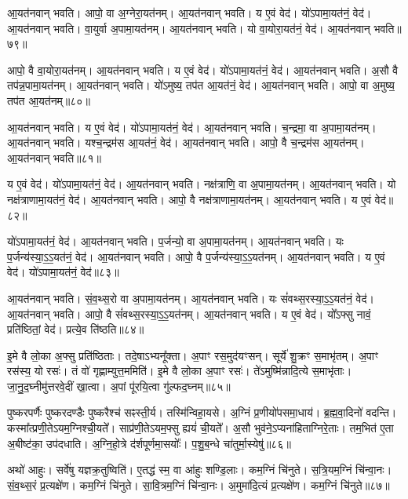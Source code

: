 आ॒यत॑नवान्‌ भवति। आपो॒ वा अ॒ग्नेरा॒यत॑नम्। 
आ॒यत॑नवान्‌ भवति। य ए॒वं वेद॑। 
यो॑\-ऽपामा॒यत॑नं॒ वेद॑। आ॒यत॑नवान्‌ भवति। 
वा॒युर्वा अ॒पामा॒यत॑नम्। आ॒यत॑नवान्‌ भवति। 
यो वा॒योरा॒यत॑नं॒ वेद॑। आ॒यत॑नवान्‌ भवति॥७९॥\ip


आपो॒ वै वा॒योरा॒यत॑नम्। आ॒यत॑नवान्‌ भवति। 
य ए॒वं वेद॑। यो॑\-ऽपामा॒यत॑नं॒ वेद॑। 
आ॒यत॑नवान्‌ भवति। अ॒सौ वै तप॑न्न॒पा\-मा॒यत॑नम्। 
आ॒यत॑नवान्‌ भवति। यो॑\-ऽमुष्य॒ तप॑त आ॒यत॑नं॒ वेद॑। 
आ॒यत॑नवान्‌ भवति। आपो॒ वा अ॒मुष्य॒ तप॑त आ॒यत॑नम्॥८०॥\ip


आ॒यत॑नवान्‌ भवति। य ए॒वं वेद॑। 
यो॑\-ऽपामा॒यत॑नं॒ वेद॑। आ॒यत॑नवान्‌ भवति। 
च॒न्द्रमा॒ वा अ॒पामा॒यत॑नम्। आ॒यत॑नवान्‌ भवति। 
यश्च॒न्द्रम॑स आ॒यत॑नं॒ वेद॑। आ॒यत॑नवान्‌ भवति। 
आपो॒ वै च॒न्द्रम॑स आ॒यत॑नम्। आ॒यत॑नवान्‌ भवति॥८१॥\ip


य ए॒वं वेद॑। यो॑\-ऽपामा॒यत॑नं॒ वेद॑। 
आ॒यत॑नवान्‌ भवति। नक्ष॑त्राणि॒ वा अ॒पामा॒यत॑नम्। 
आ॒यत॑नवान्‌ भवति। यो नक्ष॑त्राणामा॒यत॑नं॒ वेद॑। 
आ॒यत॑नवान्‌ भवति। आपो॒ वै नक्ष॑त्राणामा॒यत॑नम्। 
आ॒यत॑नवान्‌ भवति। य ए॒वं वेद॑॥८२॥\ip


यो॑\-ऽपामा॒यत॑नं॒ वेद॑। आ॒यत॑नवान्‌ भवति।
प॒र्जन्यो॒ वा अ॒पामा॒यत॑नम्। आ॒यत॑नवान्‌ भवति। 
यः प॒र्जन्य॑स्या॒\-ऽ॒\-ऽ॒\-यत॑नं॒ वेद॑। आ॒यत॑नवान्‌ भवति। 
आपो॒ वै प॒र्जन्य॑स्या॒\-ऽ॒\-ऽ॒\-यत॑नम्। आ॒यत॑नवान्‌ भवति। 
य ए॒वं वेद॑। यो॑\-ऽपामा॒यत॑नं॒ वेद॑॥८३॥\ip


आ॒यत॑नवान्‌ भवति। सं॒व॒थ्स॒रो वा अ॒पामा॒यत॑नम्। 
आ॒यत॑नवान्‌ भवति। यः सं॑वथ्स॒रस्या॒\-ऽ॒\-ऽ॒\-यत॑नं॒ वेद॑। 
आ॒यत॑नवान्‌ भवति। आपो॒ वै सं॑वथ्स॒रस्या॒\-ऽ॒\-ऽ॒\-यत॑नम्। 
आ॒यत॑नवान्‌ भवति। य ए॒वं वेद॑। 
यो᳚\-ऽफ्सु नावं॒ प्रति॑ष्ठितां॒ वेद॑। प्रत्ये॒व ति॑ष्ठति॥८४॥\ip


इ॒मे वै लो॒का अ॒फ्सु प्रति॑ष्ठिताः। तदे॒षा\-ऽभ्यनू᳚क्ता। 
अ॒पाꣳ रस॒मुद॑यꣳसन्। सूर्ये॑ शु॒क्रꣳ स॒माभृ॑तम्। 
अ॒पाꣳ रस॑स्य॒ यो रसः॑। तं वो॑ गृह्णाम्युत्त॒ममिति॑। 
इ॒मे वै लो॒का अ॒पाꣳ रसः॑। ते॑\-ऽमुष्मि॑न्नादि॒त्ये स॒माभृ॑ताः। 
जा॒नु॒द॒घ्नीमु॑त्तर\-वे॒दीं खा॒त्वा। अ॒पां पू॑रयि॒त्वा गु॑ल्फद॒घ्नम्॥८५॥\ip


पुष्करपर्णैः पुष्करदण्डैः पुष्करैश्च॑ सꣴस्ती॒र्य। तस्मि॑न्वि\-हा॒यसे। 
अ॒ग्निं प्र॒णीयो॑पसमा॒धाय॑। ब्र॒ह्म॒वा॒दिनो॑ वदन्ति। 
कस्मा᳚त्प्रणी॒ते\-ऽयम॒ग्निश्ची॒यते᳚। साप्र॑णी॒ते\-ऽयम॒फ्सु ह्ययं॑ ची॒यते᳚। 
अ॒सौ भुव॑ने॒\-ऽप्यना॑हिताग्निरे॒ताः। तम॒भित॑ ए॒ता अ॒बीष्ट॑का॒ उप॑दधाति। 
अ॒ग्नि॒हो॒त्रे द॑र्शपूर्णमा॒सयोः᳚। प॒शु॒ब॒न्धे चा॑तुर्मा॒स्येषु॑॥८६॥\ip


अथो॑ आहुः। सर्वे॑षु यज्ञक्र॒तुष्विति॑। 
ए॒तद्ध॑ स्म॒ वा आ॑हुः शण्डि॒लाः। कम॒ग्निं चि॑नुते। 
स॒त्रि॒यम॒ग्निं चि॑न्वा॒नः। सं॒व॒थ्स॒रं प्र॒त्यक्षे॑ण। 
कम॒ग्निं चि॑नुते। सा॒वि॒त्रम॒ग्निं चि॑न्वा॒नः। 
अ॒मुमा॑दि॒त्यं प्र॒त्यक्षे॑ण। कम॒ग्निं चि॑नुते॥८७॥\ip


